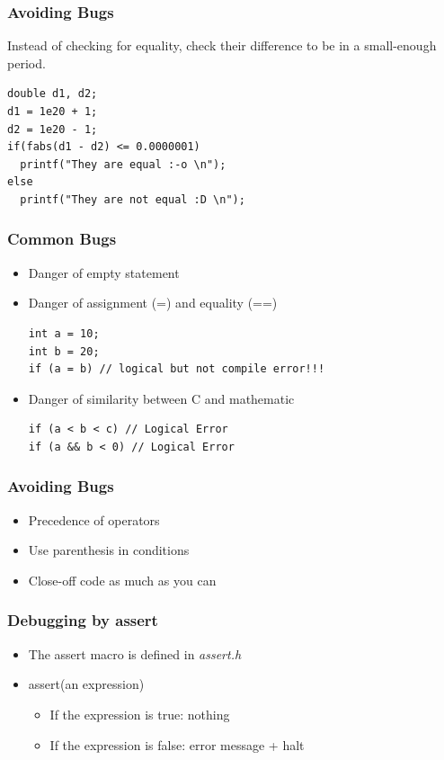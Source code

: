 \documentclass{../c-lecture}
\begin{document}
\begin{frame}[fragile]
  \frametitle{Avoiding Bugs}
  \begin{block}{}
    Instead of checking for equality, check their difference to be in a
    small-enough period.
  \end{block}
  \begin{verbatim}
double d1, d2;
d1 = 1e20 + 1;
d2 = 1e20 - 1;
if(fabs(d1 - d2) <= 0.0000001)
  printf("They are equal :-o \n");
else
  printf("They are not equal :D \n");
  \end{verbatim}
\end{frame}

\begin{frame}[fragile]
  \frametitle{Common Bugs}
  \begin{itemize}
    \item Danger of empty statement
    \item Danger of assignment (=) and equality (==)
    \begin{verbatim}
int a = 10;
int b = 20;
if (a = b) // logical but not compile error!!!
    \end{verbatim}
    \item Danger of similarity between C and mathematic
    \begin{verbatim}
if (a < b < c) // Logical Error
if (a && b < 0) // Logical Error
    \end{verbatim}
  \end{itemize}
\end{frame}

\begin{frame}
  \frametitle{Avoiding Bugs}
  \begin{itemize}
    \item Precedence of operators
    \item Use parenthesis in conditions
    \item Close-off code as much as you can
  \end{itemize}
\end{frame}

\begin{frame}
  \frametitle{Debugging by assert}
  \begin{itemize}
    \item
      The assert macro is defined in \textit{\color{Orange} assert.h}
    \item assert(an expression)
    \begin{itemize}
      \item If the expression is true: nothing
      \item If the expression is false: error message + halt
    \end{itemize}
  \end{itemize}
\end{frame}
\end{document}
